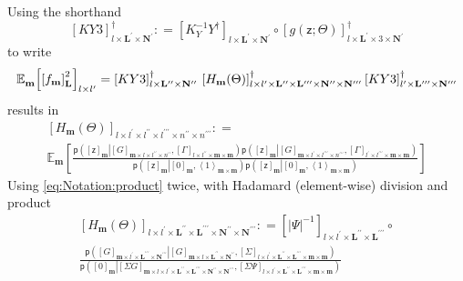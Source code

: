 \documentclass[preprint,12pt]{elsarticle}
\newcommand*{\M}[1]{\ensuremath{#1}\xspace}
\newcommand*{\x}{\times}
\newcommand*{\mi}[1]{\mathbf{#1}}
\newcommand*{\rv}[1]{\mathsf{#1}}
\newcommand*{\te}[2][]{\left\lbrack{#2}\right\rbrack_{#1}}
\newcommand*{\diag}[2][]{\left\langle{#2}\right\rangle_{#1}}
\newcommand*{\prob}[3]{\M{\mathsf{p}\!\left(\left.{#1}\right\vert{#2,#3}\right)}}
\newcommand*{\deq}{\M{\mathrel{\mathop:}=}}
\newcommand*{\ev}[3][]{\mathbb{E}_{#3}^{#1}\!\left\lbrack{#2}\right\rbrack}
\newcommand*{\evt}[3][]{\mathbb{E}_{#3}^{#1}\!#2}
\newcommand*{\modulus}[1]{\M{\left\lvert{#1}\right\rvert}}
\begin{document}
            Using the shorthand
            \begin{equation*}
                \te[l\x\mi{L^{\prime}}\x\mi{N^{\prime}}]{KY3}^{\dagger} \deq \te[l\x\mi{L^{\prime}}\x\mi{N^{\prime}}]{K_{Y}^{-1} Y^{\dagger}} \circ \te[l\x\mi{L^{\prime}}\x 3 \x\mi{N^{\prime}}]{g({\rv{z}}; \Theta)}^{\dagger}
            \end{equation*}
            to write
            \begin{equation*}                
                \evt{\te[l\x l^{\prime}]{\te[\mi{L}]{f_{\mi{m}}}^{2}}}{\mi{m}} = \te[l\x\mi{L^{\prime\prime}}\x\mi{N^{\prime\prime}}]{KY3}^{\dagger} \\
                \te[l \x l^{\prime}\x\mi{L^{\prime\prime}}\x\mi{L^{\prime\prime\prime}}\x\mi{N^{\prime\prime}}\x\mi{N^{\prime\prime\prime}}]{H_{\mi{m}}(\Theta)}^{\dagger}
                \te[l^{\prime}\x\mi{L^{\prime\prime\prime}}\x\mi{N^{\prime\prime\prime}}]{KY3}^{\dagger}
            \end{equation*}
            results in
            \begin{multline*}
                \te[l \x l^{\prime}\x l^{\prime\prime}\x l^{\prime\prime\prime}\x n^{\prime\prime}\x n^{\prime\prime\prime}]{H_{\mi{m}}(\Theta)} \deq \\
                \ev{\frac{
                    \prob{\te[\mi{m}]{\rv{z}}}{\te[\mi{m}\x l\x l^{\prime\prime}\x n^{\prime\prime}]{G}}{\te[l\x l^{\prime\prime}\x\mi{m}\x\mi{m}]{\Gamma}}
                    \prob{\te[\mi{m}]{\rv{z}}}{\te[\mi{m}\x l^{\prime}\x l^{\prime\prime\prime}\x n^{\prime\prime\prime}]{G}}{\te[l^{\prime}\x l^{\prime\prime\prime}\x \mi{m}\x\mi{m}]{\Gamma}}}
                {\prob{\te[\mi{m}]{\rv{z}}}{\te[\mi{m}]{0}}{\diag[\mi{m\x m}]{1}}
                \prob{\te[\mi{m}]{\rv{z}}}{\te[\mi{m}]{0}}{\diag[\mi{m\x m}]{1}}}}{\mi{m}}
            \end{multline*}
            Using \cref{eq:Notation:product} twice, with Hadamard (element-wise) division and product
            \begin{multline*}
                \te[l \x l^{\prime}\x\mi{L^{\prime\prime}}\x\mi{L^{\prime\prime\prime}}\x\mi{N^{\prime\prime}}\x\mi{N^{\prime\prime\prime}}]{H_{\mi{m}}(\Theta)} \deq
                \te[l\x l^{\prime}\x \mi{L^{\prime\prime}}\x \mi{L^{\prime\prime\prime}}]{\modulus{\Psi}^{-1}} \circ \\
                \frac{
                    \prob{\te[\mi{m}\x l^{\prime}\x\mi{L^{\prime\prime\prime}}\x\mi{N^{\prime\prime\prime}}]{G}}
                    {\te[\mi{m}\x l\x\mi{L^{\prime\prime}}\x\mi{N^{\prime\prime}}]{G}}{\te[l \x l^{\prime}\x\mi{L^{\prime\prime}}\x\mi{L^{\prime\prime\prime}}\x\mi{m}\x\mi{m}]{\Sigma}}
                    }
                {\prob{\te[\mi{m}]{0}}
                {\te[\mi{m}\x l \x l^{\prime}\x\mi{L^{\prime\prime}}\x\mi{L^{\prime\prime\prime}}\x\mi{N^{\prime\prime}}\x\mi{N^{\prime\prime\prime}}]{\Sigma G}}{\te[l \x l^{\prime}\x\mi{L^{\prime\prime}}\x\mi{L^{\prime\prime\prime}}\x\mi{m}\x\mi{m}]{\Sigma\Psi}}}
            \end{multline*}
\end{document}
